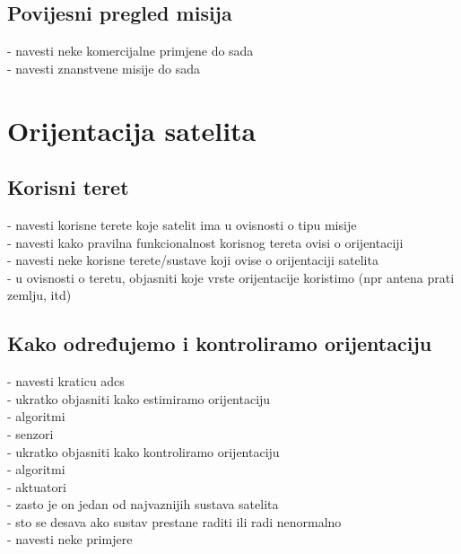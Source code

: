 \documentclass[times, utf8, diplomski, numeric]{templates/template}
\begin{document}
{{        \subsection{Povijesni pregled misija}{
            - navesti neke komercijalne primjene do sada\\
            - navesti znanstvene misije do sada\\
        }
    }

    \section{Orijentacija satelita}{
        \subsection{Korisni teret}{
            - navesti korisne terete koje satelit ima u ovisnosti o tipu misije\\
            - navesti kako pravilna funkcionalnost korisnog tereta ovisi o orijentaciji  \\
            - navesti neke korisne terete/sustave koji ovise o orijentaciji satelita\\
            - u ovisnosti o teretu, objasniti koje vrste orijentacije koristimo (npr antena prati zemlju, itd)\\
        }
    
        \subsection{Kako određujemo i kontroliramo orijentaciju}{
            - navesti kraticu adcs\\
            - ukratko objasniti kako estimiramo orijentaciju\\
                - algoritmi\\
                - senzori\\
            - ukratko objasniti kako kontroliramo orijentaciju\\
                - algoritmi\\
                - aktuatori\\
            - zasto je on jedan od najvaznijih sustava satelita\\
            - sto se desava ako sustav prestane raditi ili radi nenormalno\\
                - navesti neke primjere\\
        }
    }
}
\end{document}
